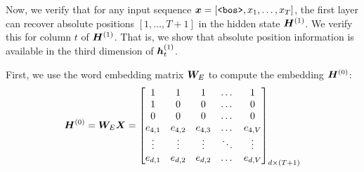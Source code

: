 \documentclass{article}
\begin{document}
Now, we verify that for any input sequence ${\bm{x}} = \left[\texttt{<bos>}, x_1, \ldots, x_T\right]$, the first layer can recover absolute positions $[1, \ldots, T+1]$ in the hidden state ${\bm{H}}^{(1)}$. We verify this for column $t$ of ${\bm{H}}^{(1)}$. That is, we show that absolute position information is available in the third dimension of ${\bm{h}}_t^{(1)}$.

First, we use the word embedding matrix ${\bm{W}}_E$ to compute the embedding ${\bm{H}}^{(0)}$:
\begin{align}
  \label{eq:abs_hidden_state_0}
  {\bm{H}}^{(0)} = {\bm{W}}_E {\bm{X}} = \begin{bmatrix}
                            1       & 1       & 1       & \dots  & 1       \\
                            1       & 0       & 0       & \dots  & 0       \\
                            0       & 0       & 0       & \dots  & 0       \\
                            e_{4,1} & e_{4,2} & e_{4,3} & \dots  & e_{4,V} \\
                            \vdots  & \vdots  & \vdots  & \ddots & \vdots  \\
                            e_{d,1} & e_{d,2} & e_{d,2} & \dots  & e_{d,V}
                          \end{bmatrix}_{d \times (T+1)}
\end{align}
\end{document}
